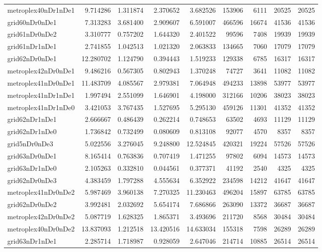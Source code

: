 \begin{longtable}{|l|r|r|r|r|r|r|r|r|}
metroplex40nDr1nDe1 & 9.714286 & 1.311874 & 2.370652 & 3.682526 & 153906 & 6111 & 20525 & 20525 \\
grid60nDr0nDe1 & 7.313283 & 3.681400 & 2.909607 & 6.591007 & 466596 & 16674 & 41536 & 41536 \\
grid61nDr0nDe2 & 3.310777 & 0.757202 & 1.644320 & 2.401522 & 99596 & 7408 & 19939 & 19939 \\
grid61nDr1nDe1 & 2.741855 & 1.042513 & 1.021320 & 2.063833 & 134665 & 7060 & 17079 & 17079 \\
grid62nDr0nDe1 & 12.280702 & 1.124790 & 0.394443 & 1.519233 & 129338 & 6785 & 16317 & 16317 \\
metroplex42nDr0nDe1 & 9.486216 & 0.567305 & 0.802943 & 1.370248 & 74727 & 3641 & 11082 & 11082 \\
metroplex41nDr0nDe1 & 11.483709 & 4.085567 & 2.979381 & 7.064948 & 494233 & 13898 & 53977 & 53977 \\
metroplex41nDr1nDe1 & 1.997494 & 2.551099 & 1.646901 & 4.198000 & 312166 & 10206 & 38023 & 38023 \\
metroplex41nDr1nDe0 & 3.421053 & 3.767435 & 1.527695 & 5.295130 & 459126 & 11301 & 41352 & 41352 \\
grid62nDr1nDe1 & 2.666667 & 0.486439 & 0.262214 & 0.748653 & 63502 & 4693 & 11129 & 11129 \\
grid62nDr1nDe0 & 1.736842 & 0.732499 & 0.080609 & 0.813108 & 92077 & 4570 & 8357 & 8357 \\
grid5nDr0nDe3 & 5.022556 & 3.276045 & 9.248800 & 12.524845 & 420321 & 19224 & 57526 & 57526 \\
grid63nDr0nDe1 & 8.165414 & 0.763836 & 0.707419 & 1.471255 & 97802 & 6094 & 14573 & 14573 \\
grid63nDr1nDe0 & 2.105263 & 0.332810 & 0.044561 & 0.377371 & 41192 & 2540 & 4325 & 4325 \\
grid62nDr0nDe3 & 4.383459 & 1.797288 & 4.555634 & 6.352922 & 234598 & 14212 & 41647 & 41647 \\
metroplex41nDr0nDe2 & 5.987469 & 3.960138 & 7.270325 & 11.230463 & 496204 & 15897 & 63785 & 63785 \\
grid62nDr0nDe2 & 3.992481 & 2.032692 & 5.654174 & 7.686866 & 263090 & 13372 & 36687 & 36687 \\
metroplex42nDr0nDe2 & 5.087719 & 1.628325 & 1.865371 & 3.493696 & 211720 & 8568 & 30484 & 30484 \\
metroplex40nDr0nDe2 & 13.837093 & 1.212518 & 13.420516 & 14.633034 & 155318 & 7598 & 26289 & 26289 \\
grid63nDr1nDe1 & 2.285714 & 1.718987 & 0.928059 & 2.647046 & 214714 & 10885 & 26514 & 26514 \\

\end{longtable}
